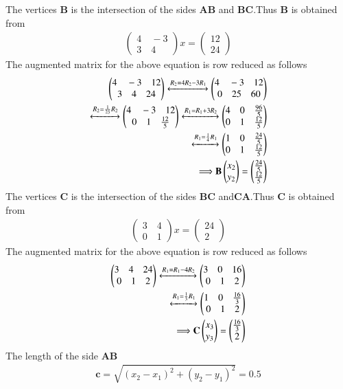 \documentclass[journal,12pt,twocolumn]{IEEEtran}
\newcommand{\myvec}[1]{\ensuremath{\begin{pmatrix}#1\end{pmatrix}}}
\numberwithin{equation}{subsection}
\let\vec\mathbf
\begin{document}
  The vertices $\vec{B}$ is the intersection of the sides $\vec{AB}$ and $\vec{BC}$.Thus $\vec{B}$ is obtained from
 \begin{align}
 \myvec{4\quad-3\\3\quad4}x=\myvec{12\\24}
 \end{align}
 The augmented matrix for the above equation is row reduced as follows
 \begin{align}
 \myvec{4\quad-3\quad 12\\3\quad4\quad24}\xleftrightarrow{R_2=4R_2-3R_1}\myvec{4\quad-3\quad 12\\0\quad25\quad60}\\\xleftrightarrow{R_2=\frac{1}{25}R_2}\myvec{4\quad-3\quad 12\\0\quad1\quad\frac{12}{5}}\xleftrightarrow{R_1=R_1+3R_2}\myvec{4\quad0\quad\frac{96}{5}\\0\quad1\quad\frac{12}{5}}\\
 \xleftrightarrow{R_1=\frac{1}{4}R_1}\myvec{1\quad0\quad\frac{24}{5}\\0\quad1\quad\frac{12}{5}}\\
 \Longrightarrow\vec{B}\myvec{x_2 \\y_2}=\myvec{\frac{24}{5}\\\frac{12}{5}}
 \end{align}
 The vertices $\vec{C}$ is the intersection of the sides $\vec{BC}$ and$\vec{CA}$.Thus $\vec{C}$ is obtained from
 \begin{align}
 \myvec{3\quad4\\0\quad 1}x=\myvec{24\\2}
 \end{align}
 The augmented matrix for the above equation is row reduced as follows
\begin{align}
 \myvec{3\quad4\quad 24\\0\quad1\quad2}\xleftrightarrow{R_1=R_1-4R_2}\myvec{3\quad0\quad 16\\0\quad1\quad2}\\\xleftrightarrow{R_1=\frac{1}{3}R_1}\myvec{1\quad0\quad\frac{16}{3}\\0\quad1\quad2}\\
 \Longrightarrow\vec{C}\myvec{x_3 \\y_3}=\myvec{\frac{16}{3}\\2}
 \end{align}
 The length of the side $\vec{AB}$
 \begin{align}
 \vec{c}=\sqrt{(x_2-x_1)^2+(y_2-y_1)^2}=0.5
 \end{align}
\end{document}

